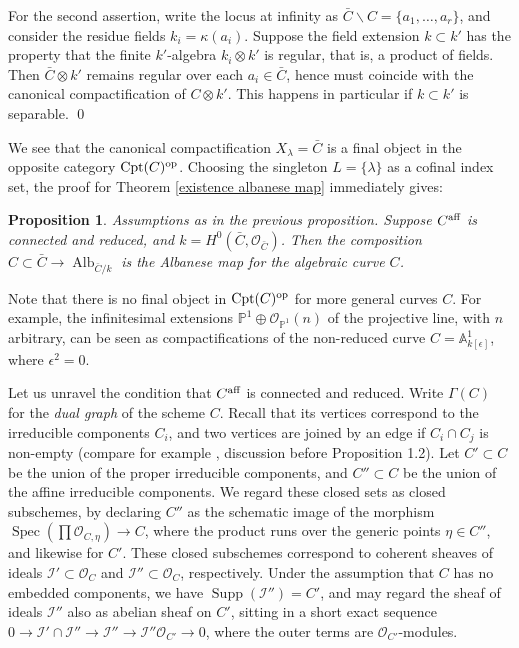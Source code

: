 \documentclass[oneside, 12pt]{amsart}
\newcommand\mylabel[1]{\label{#1}\marginpar{\vspace{-1ex}\medskip\medskip\footnotesize \tt #1}}
\renewcommand\mylabel[1]{\label{#1}}
\newtheorem{proposition}[theorem]{Proposition}
\theoremstyle{definition}
\theoremstyle{remark}
\newcommand{\PP}{\mathbb{P}}
\renewcommand{\AA}{\mathbb{A}}
\newcommand{\shI}{\mathscr{I}}
\newcommand{\aff}{\text{\rm aff}}
\newcommand{\Alb}{\operatorname{Alb}}
\renewcommand{\O}{\mathscr{O}}
\newcommand{\op}{\text{\rm op}}
\newcommand{\ra}{\rightarrow}
\newcommand{\Spec}{\operatorname{Spec}}
\newcommand{\Supp}{\operatorname{Supp}}
\newcommand{\Cpt}{\operatorname{Cpt}}
\begin{document}
For the second assertion, write the locus at infinity as $\bar{C}\smallsetminus C=\{a_1,\ldots,a_r\}$,
and consider the residue fields $k_i=\kappa(a_i)$. Suppose the field extension $k\subset k'$ has the property
that the finite $k'$-algebra $k_i\otimes k'$ is regular, that is,  a product of fields. Then $\bar{C}\otimes k'$ remains regular over each $a_i\in \bar{C}$,
hence must coincide with the canonical compactification of $C\otimes k'$. This happens in particular if $k\subset k'$ is separable.
\qed

\medskip
We see that the canonical compactification $X_\lambda=\bar{C}$ is a final object in the opposite category $\Cpt(C)^\op$.
Choosing the singleton $L=\{\lambda\}$ as a cofinal index set, the proof for Theorem \ref{existence albanese map} immediately gives:

\begin{proposition}
\mylabel{albanese for curves}
Assumptions as in the previous proposition. Suppose $C^\aff$ is connected and reduced, and  $k=H^0(\bar{C},\O_{\bar{C}})$.
Then  the composition $C\subset \bar{C}\ra\Alb_{\bar{C}/k}$ is the Albanese map for the algebraic curve $C$.  
\end{proposition}

Note  that there is no final object in $\Cpt(C)^\op$ for more general curves $C$. For example,
the infinitesimal extensions $\PP^1\oplus\O_{\PP^1}(n)$ of the projective line, with $n$ arbitrary, can be seen as compactifications
of the non-reduced   curve $C= \AA^1_{k[\epsilon]}$, where $\epsilon^2=0$.

Let us unravel the condition that $C^\aff$ is connected and reduced.
Write  $\Gamma(C)$ for the \emph{dual graph} of the scheme $C$.
Recall that its  vertices correspond to the irreducible components $C_i$,
and two vertices are joined by an edge if $C_i\cap C_j$ is non-empty (compare for example \cite{Schroeer 2023}, discussion before Proposition 1.2). 
Let $C'\subset C$ be the union of the proper irreducible components, and 
$C''\subset C$ be the union of the affine irreducible components.
We regard these closed sets as closed subschemes, by declaring $C''$ as the schematic image of 
the morphism $\Spec(\prod\O_{C,\eta})\ra C$, where the product runs over the generic points $\eta\in C''$,
and likewise for $C'$.
These closed subschemes correspond to coherent sheaves of ideals $\shI'\subset\O_C$ and
$\shI''\subset\O_C$, respectively. Under the assumption that $C$ has no embedded components, we have  $\Supp(\shI'')=C'$, 
and may regard the sheaf of ideals $\shI''$  also as abelian sheaf on  $C'$, sitting in a short exact sequence
$0\ra \shI'\cap\shI''\ra \shI''\ra \shI''\O_{C'}\ra 0$, where the outer terms are $\O_{C'}$-modules.
\end{document}
